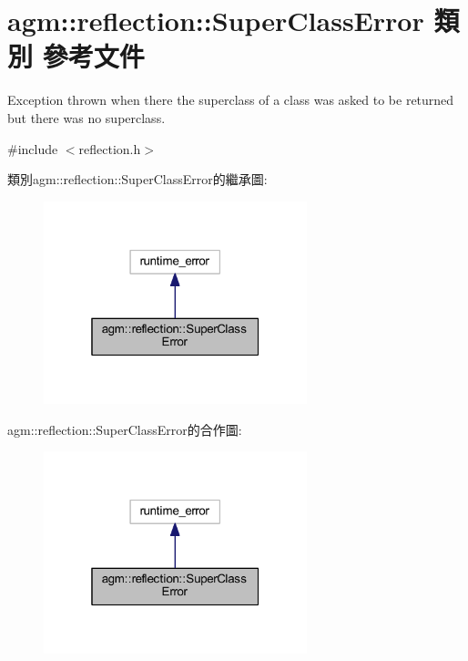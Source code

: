 \hypertarget{classagm_1_1reflection_1_1_super_class_error}{}\section{agm\+:\+:reflection\+:\+:Super\+Class\+Error 類別 參考文件}
\label{classagm_1_1reflection_1_1_super_class_error}


Exception thrown when there the superclass of a class was asked to be returned but there was no superclass.  




{\ttfamily \#include $<$reflection.\+h$>$}



類別agm\+:\+:reflection\+:\+:Super\+Class\+Error的繼承圖\+:\nopagebreak
\begin{figure}[H]
\begin{center}
\leavevmode
\includegraphics[width=217pt]{classagm_1_1reflection_1_1_super_class_error__inherit__graph}
\end{center}
\end{figure}


agm\+:\+:reflection\+:\+:Super\+Class\+Error的合作圖\+:\nopagebreak
\begin{figure}[H]
\begin{center}
\leavevmode
\includegraphics[width=217pt]{classagm_1_1reflection_1_1_super_class_error__coll__graph}
\end{center}
\end{figure}
